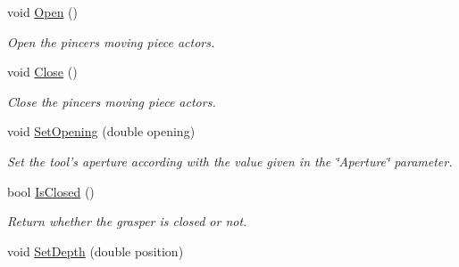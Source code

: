 \begin{DoxyCompactItemize}
void \hyperlink{classvtkToolPincers_a0a0d2fdd1ac4ccc1823de3969a0aa45d}{Open} ()
\begin{DoxyCompactList}\small\item\em Open the pincers moving piece actors. \item\end{DoxyCompactList}\item 
void \hyperlink{classvtkToolPincers_ab32a090979f21b03f57347c4635d2b76}{Close} ()
\begin{DoxyCompactList}\small\item\em Close the pincers moving piece actors. \item\end{DoxyCompactList}\item 
void \hyperlink{classvtkToolPincers_a6314454d06c23e49fe1908812441658f}{SetOpening} (double opening)
\begin{DoxyCompactList}\small\item\em Set the tool's aperture according with the value given in the \char`\"{}Aperture\char`\"{} parameter. \item\end{DoxyCompactList}\item 
\hypertarget{classvtkToolPincers_ae88874d711a3d2a748ec43b9ed546863}{
bool \hyperlink{classvtkToolPincers_ae88874d711a3d2a748ec43b9ed546863}{IsClosed} ()}
\label{classvtkToolPincers_ae88874d711a3d2a748ec43b9ed546863}

\begin{DoxyCompactList}\small\item\em Return whether the grasper is closed or not. \item\end{DoxyCompactList}\item 
\hypertarget{classvtkToolPincers_a462ddc9c30e720c4b86de714c5ac566c}{
void \hyperlink{classvtkToolPincers_a462ddc9c30e720c4b86de714c5ac566c}{SetDepth} (double position)}
\label{classvtkToolPincers_a462ddc9c30e720c4b86de714c5ac566c}


\end{DoxyCompactItemize}
